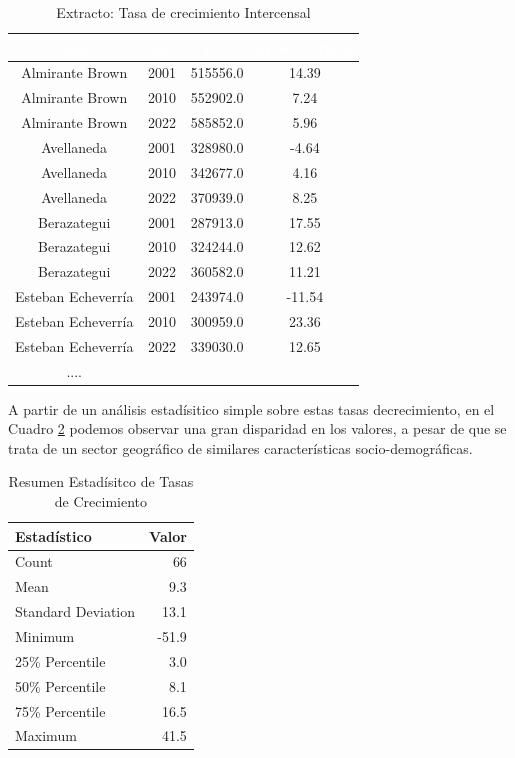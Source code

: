 \documentclass{article}
\theoremstyle{mytheoremstyle}
\theoremstyle{mytheoremstyle}
\theoremstyle{myproblemstyle}
\begin{document}
  \begin{table}[htb]
    \centering
    \begin{tabular}{|c|c|c|c|}
    \hline
    \textbf{\cellcolor[rgb]{0,0.231,0.427}\textcolor{white}{nam}} &
     \textbf{\cellcolor[rgb]{0,0.231,0.427}\textcolor{white}{anio}}
      & \textbf{\cellcolor[rgb]{0,0.231,0.427}\textcolor{white}{pob}}
       & \textbf{\cellcolor[rgb]{0,0.231,0.427}\textcolor{white}{growth\_ratio}} \\ \hline
    Almirante Brown & 2001 & 515556.0 & 14.39 \\
    Almirante Brown & 2010 & 552902.0 & 7.24 \\
    Almirante Brown & 2022 & 585852.0 & 5.96 \\
    Avellaneda & 2001 & 328980.0 & -4.64 \\
    Avellaneda & 2010 & 342677.0 & 4.16 \\
    Avellaneda & 2022 & 370939.0 & 8.25 \\
    Berazategui & 2001 & 287913.0 & 17.55 \\
    Berazategui & 2010 & 324244.0 & 12.62 \\
    Berazategui & 2022 & 360582.0 & 11.21 \\
    Esteban Echeverría & 2001 & 243974.0 & -11.54 \\
    Esteban Echeverría & 2010 & 300959.0 & 23.36 \\
    Esteban Echeverría & 2022 & 339030.0 & 12.65 \\
      ....& & & \\
  
    \hline
    \end{tabular}
    \caption{Extracto: Tasa de crecimiento Intercensal}
  \label{tab:RatiosAll}
    \end{table}
  

  A partir de un análisis estadísitico simple sobre estas tasas decrecimiento, en el Cuadro \ref{tab:summary_growth_ratio} 
podemos observar una gran disparidad en los valores, a pesar de que se trata de un sector geográfico de similares características socio-demográficas. 
\begin{table}[htbp]
    \centering
    \begin{tabular}{lr}
        \hline
        \textbf{Estadístico} & \textbf{Valor} \\
        \hline
        Count & 66\\
        Mean & 9.3 \\
        Standard Deviation & 13.1 \\
        Minimum & -51.9 \\
        25\% Percentile & 3.0 \\
        50\% Percentile & 8.1\\
        75\% Percentile & 16.5 \\
        Maximum & 41.5 \\
        \hline
    \end{tabular}
    \caption{Resumen Estadísitco de Tasas de Crecimiento}
    \label{tab:summary_growth_ratio}
\end{table}
\newline\newline
\end{document}

